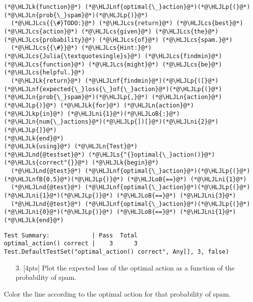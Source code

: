 \documentclass[12pt,a4paper]{article}
\newcommand{\HLJLk}[1]{\textcolor[RGB]{148,91,176}{\textbf{#1}}}
\newcommand{\HLJLkp}[1]{\textcolor[RGB]{148,91,176}{\textbf{#1}}}
\newcommand{\HLJLn}[1]{#1}
\newcommand{\HLJLnd}[1]{\textcolor[RGB]{214,102,97}{#1}}
\newcommand{\HLJLnf}[1]{\textcolor[RGB]{66,102,213}{#1}}
\newcommand{\HLJLs}[1]{\textcolor[RGB]{201,61,57}{#1}}
\newcommand{\HLJLnfB}[1]{\textcolor[RGB]{59,151,46}{#1}}
\newcommand{\HLJLni}[1]{\textcolor[RGB]{59,151,46}{#1}}
\newcommand{\HLJLoB}[1]{\textcolor[RGB]{102,102,102}{\textbf{#1}}}
\newcommand{\HLJLp}[1]{#1}
\newcommand{\HLJLcs}[1]{\textcolor[RGB]{153,153,119}{\textit{#1}}}
\begin{document}
\begin{lstlisting}
(*@\HLJLk{function}@*) (*@\HLJLnf{optimal{\_}action}@*)(*@\HLJLp{(}@*)(*@\HLJLn{prob{\_}spam}@*)(*@\HLJLp{)}@*)
  (*@\HLJLcs{{\#}TODO:}@*) (*@\HLJLcs{return}@*) (*@\HLJLcs{best}@*) (*@\HLJLcs{action}@*) (*@\HLJLcs{given}@*) (*@\HLJLcs{the}@*) (*@\HLJLcs{probability}@*) (*@\HLJLcs{of}@*) (*@\HLJLcs{spam.}@*)
  (*@\HLJLcs{{\#}}@*) (*@\HLJLcs{Hint:}@*) (*@\HLJLcs{Julia{\textquotesingle}s}@*) (*@\HLJLcs{findmin}@*) (*@\HLJLcs{function}@*) (*@\HLJLcs{might}@*) (*@\HLJLcs{be}@*) (*@\HLJLcs{helpful.}@*)
  (*@\HLJLk{return}@*) (*@\HLJLnf{findmin}@*)(*@\HLJLp{([}@*)(*@\HLJLnf{expected{\_}loss{\_}of{\_}action}@*)(*@\HLJLp{(}@*)(*@\HLJLn{prob{\_}spam}@*)(*@\HLJLp{,}@*) (*@\HLJLn{action}@*)(*@\HLJLp{)}@*) (*@\HLJLk{for}@*) (*@\HLJLn{action}@*) (*@\HLJLkp{in}@*) (*@\HLJLni{1}@*)(*@\HLJLoB{:}@*)(*@\HLJLn{num{\_}actions}@*)(*@\HLJLp{])[}@*)(*@\HLJLni{2}@*)(*@\HLJLp{]}@*)
(*@\HLJLk{end}@*)
(*@\HLJLk{using}@*) (*@\HLJLn{Test}@*)
(*@\HLJLnd{@testset}@*) (*@\HLJLs{"{}optimal{\_}action()}@*) (*@\HLJLs{correct"{}}@*) (*@\HLJLk{begin}@*)
  (*@\HLJLnd{@test}@*) (*@\HLJLnf{optimal{\_}action}@*)(*@\HLJLp{(}@*)(*@\HLJLnfB{0.5}@*)(*@\HLJLp{)}@*) (*@\HLJLoB{==}@*) (*@\HLJLni{1}@*)
  (*@\HLJLnd{@test}@*) (*@\HLJLnf{optimal{\_}action}@*)(*@\HLJLp{(}@*)(*@\HLJLni{1}@*)(*@\HLJLp{)}@*) (*@\HLJLoB{==}@*) (*@\HLJLni{3}@*)
  (*@\HLJLnd{@test}@*) (*@\HLJLnf{optimal{\_}action}@*)(*@\HLJLp{(}@*)(*@\HLJLni{0}@*)(*@\HLJLp{)}@*) (*@\HLJLoB{==}@*) (*@\HLJLni{1}@*)
(*@\HLJLk{end}@*)
\end{lstlisting}

\begin{lstlisting}
Test Summary:            | Pass  Total
optimal_action() correct |    3      3
Test.DefaultTestSet("optimal_action() correct", Any[], 3, false)
\end{lstlisting}


\begin{itemize}
\item[3. ] [4pts] Plot the expected loss of the optimal action as a function of the probability of spam.

\end{itemize}
Color the line according to the optimal action for that probability of spam.
\end{document}
